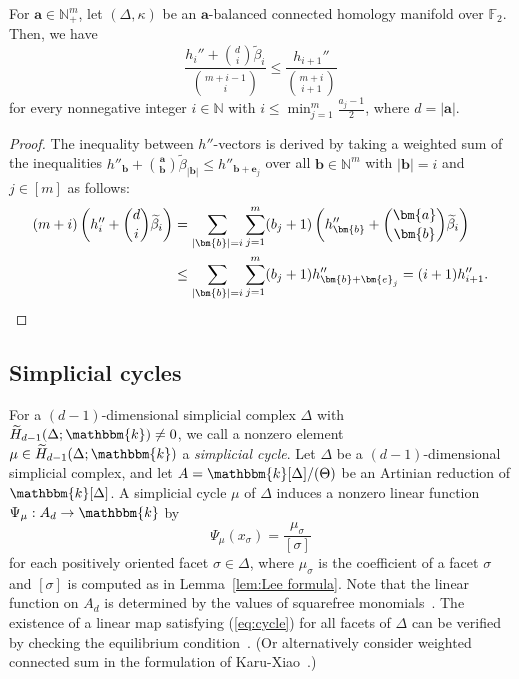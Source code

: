 \begin{coro} \label{cor:mfd-h}
For $\bm{a} \in \mathbb{N}^m_+$, let $(\Delta,\kappa)$ be an $\bm{a}$-balanced connected homology manifold over $\mathbb{F}_2$. Then, we have
\[
\frac{h_i''+\binom{d}{i}\widetilde{\beta}_{i}}{\binom{m+i-1}{i}} \leq \frac{h_{i+1}''}{\binom{m+i}{i+1}}
\]
for every nonnegative integer $i \in \mathbb{N}$ with $i\leq \min_{j=1}^m \frac{a_j-1}{2}$, where $d=|\bm{a}|$.
\end{coro}
\begin{proof}
The inequality between $h''$-vectors is derived by taking a weighted sum of the inequalities $h''_{\bm{b}} + \binom{\bm{a}}{\bm{b}}\widetilde{\beta}_{|\bm{b}|} \leq h''_{\bm{b}+\bm{e}_j}$ over all $\bm{b} \in \mathbb{N}^m$ with $|\bm{b}|=i$ and $j \in [m]$ as follows:
\begin{align*}
(m+i) \left(h''_i+\binom{d}{i}\widetilde{\beta}_i\right)
&=\sum_{|\bm{b}|=i}\sum_{j=1}^m (b_j+1)\left(h''_{\bm{b}}+\binom{\bm{a}}{\bm{b}}\widetilde{\beta}_i \right) \\
&\leq \sum_{|\bm{b}|=i}\sum_{j=1}^m (b_j+1)h''_{\bm{b}+\bm{e}_j}
=(i+1) h''_{i+1}. \qedhere
\end{align*}
\end{proof}

\subsection{Simplicial cycles}
For a $(d-1)$-dimensional simplicial complex $\Delta$ with $\widetilde{H}_{d-1}(\Delta;\mathbbm{k}) \neq 0$, we call a nonzero element $\mu \in \widetilde{H}_{d-1}(\Delta;\mathbbm{k})$ a \emph{simplicial cycle}.
Let $\Delta$ be a $(d-1)$-dimensional simplicial complex, and let $A=\mathbbm{k}[\Delta]/(\Theta)$ be an Artinian reduction of $\mathbbm{k}[\Delta]$.
A simplicial cycle $\mu$ of $\Delta$ induces a nonzero linear function $\Psi_\mu:A_{d} \rightarrow \mathbbm{k}$ by 
\begin{equation}
\Psi_\mu(x_\sigma) = \frac{\mu_\sigma}{[\sigma]} \label{eq:cycle}
\end{equation}
for each positively oriented facet $\sigma \in \Delta$, where $\mu_\sigma$ is the coefficient of a facet $\sigma$ and $[\sigma]$ is computed as in Lemma~\ref{lem:Lee formula}. Note that the linear function on $A_d$ is determined by the values of squarefree monomials~\cite[Theorem 9]{Lee}.
The existence of a linear map satisfying (\ref{eq:cycle}) for all facets of $\Delta$ can be verified by checking the equilibrium condition~\cite[Theorem 10]{Lee}. (Or alternatively consider weighted connected sum in the formulation of Karu-Xiao~\cite{KX}.)

